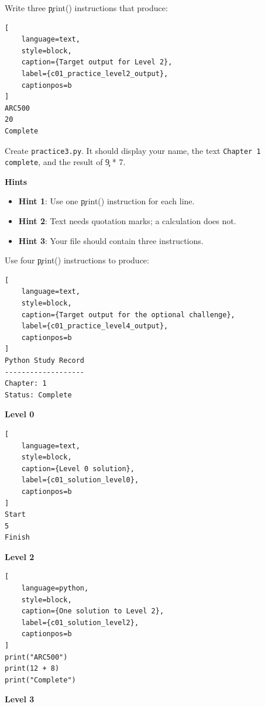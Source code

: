 
Write three \c{print()} instructions that produce:

\begin{lstlisting}[
    language=text,
    style=block,
    caption={Target output for Level 2},
    label={c01_practice_level2_output},
    captionpos=b
]
ARC500
20
Complete
\end{lstlisting}


Create \texttt{practice3.py}. It should display your name, the text
\texttt{Chapter 1 complete}, and the result of \c{9 * 7}.

\textbf{Hints}
\begin{itemize}
    \item \textbf{Hint 1}: Use one \c{print()} instruction for each line.
    \item \textbf{Hint 2}: Text needs quotation marks; a calculation does not.
    \item \textbf{Hint 3}: Your file should contain three instructions.
\end{itemize}


Use four \c{print()} instructions to produce:

\begin{lstlisting}[
    language=text,
    style=block,
    caption={Target output for the optional challenge},
    label={c01_practice_level4_output},
    captionpos=b
]
Python Study Record
-------------------
Chapter: 1
Status: Complete
\end{lstlisting}


\textbf{Level 0}

\begin{lstlisting}[
    language=text,
    style=block,
    caption={Level 0 solution},
    label={c01_solution_level0},
    captionpos=b
]
Start
5
Finish
\end{lstlisting}

\textbf{Level 2}

\begin{lstlisting}[
    language=python,
    style=block,
    caption={One solution to Level 2},
    label={c01_solution_level2},
    captionpos=b
]
print("ARC500")
print(12 + 8)
print("Complete")
\end{lstlisting}

\textbf{Level 3}

